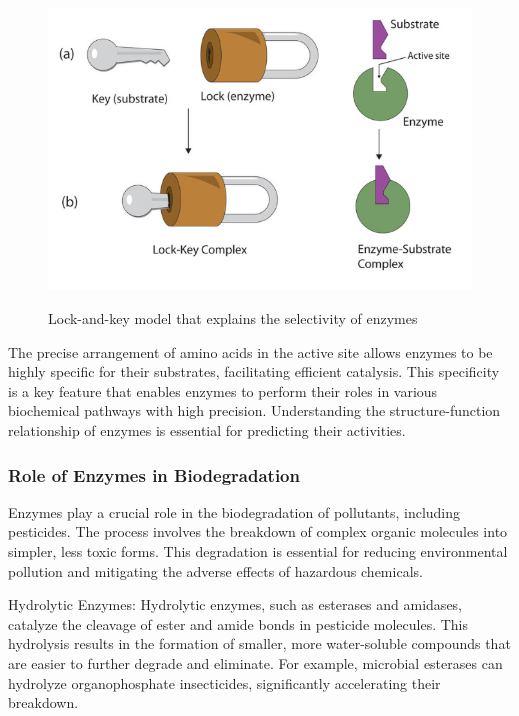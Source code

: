 \begin{figure}[hbt]
    \centering
    \begin{minipage}[t]{.8\textwidth}
    \caption{Lock-and-key model that explains the selectivity of enzymes}
    \includegraphics[width=1\textwidth]{img/key_lock_principle.png}\\
    \label{fig:LockKeyPrinciple}
    \end{minipage}
\end{figure}

The precise arrangement of amino acids in the active site allows enzymes to be highly specific for their substrates, facilitating efficient catalysis. This specificity is a key feature that enables enzymes to perform their roles in various biochemical pathways with high precision. Understanding the structure-function relationship of enzymes is essential for predicting their activities.

\subsubsection{Role of Enzymes in Biodegradation}
\label{sec:Role of Enzymes in Biodegradation}

Enzymes play a crucial role in the biodegradation of pollutants, including pesticides. The process involves the breakdown of complex organic molecules into simpler, less toxic forms. This degradation is essential for reducing environmental pollution and mitigating the adverse effects of hazardous chemicals.

Hydrolytic Enzymes: Hydrolytic enzymes, such as esterases and amidases, catalyze the cleavage of ester and amide bonds in pesticide molecules. This hydrolysis results in the formation of smaller, more water-soluble compounds that are easier to further degrade and eliminate. For example, microbial esterases can hydrolyze organophosphate insecticides, significantly accelerating their breakdown. \autocite{munneckeEnzymaticHydrolysisOrganophosphate1976}

